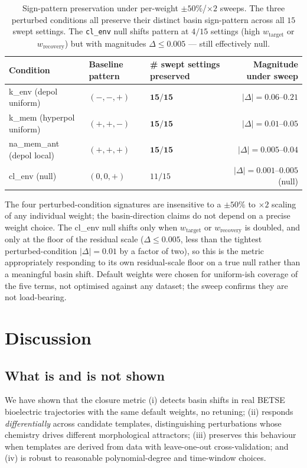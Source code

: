 \documentclass[11pt,a4paper]{article}
\begin{document}
\begin{table}[h]\centering\small
\caption{Sign-pattern preservation under per-weight $\pm 50\%$/$\times 2$ sweeps. The three perturbed conditions all preserve their distinct basin sign-pattern across all $15$ swept settings. The \texttt{cl\_env} null shifts pattern at $4/15$ settings (high $w_{\mathrm{target}}$ or $w_{\mathrm{recovery}}$) but with magnitudes $\Delta\leq 0.005$ --- still effectively null.}\label{tab:weights}
\begin{tabular}{lllr}\toprule
Condition & Baseline pattern & \# swept settings preserved & Magnitude under sweep \\
\midrule
k\_env (depol uniform)        & $(-,-,+)$ & $\mathbf{15/15}$ & $|\Delta|=0.06$--$0.21$ \\
k\_mem (hyperpol uniform)     & $(+,+,-)$ & $\mathbf{15/15}$ & $|\Delta|=0.01$--$0.05$ \\
na\_mem\_ant (depol local)    & $(+,+,+)$ & $\mathbf{15/15}$ & $|\Delta|=0.005$--$0.04$ \\
cl\_env (null)                & $(0,0,+)$ & $11/15$    & $|\Delta|=0.001$--$0.005$ (null) \\
\bottomrule\end{tabular}
\end{table}

The four perturbed-condition signatures are insensitive to a $\pm 50\%$ to $\times 2$ scaling of any individual weight; the basin-direction claims do not depend on a precise weight choice. The cl\_env null shifts only when $w_{\mathrm{target}}$ or $w_{\mathrm{recovery}}$ is doubled, and only at the floor of the residual scale ($\Delta\leq 0.005$, less than the tightest perturbed-condition $|\Delta|=0.01$ by a factor of two), so this is the metric appropriately responding to its own residual-scale floor on a true null rather than a meaningful basin shift. Default weights were chosen for uniform-ish coverage of the five terms, not optimised against any dataset; the sweep confirms they are not load-bearing.

\section{Discussion}

\subsection{What is and is not shown}

We have shown that the closure metric (i) detects basin shifts in real BETSE bioelectric trajectories with the same default weights, no retuning; (ii) responds \emph{differentially} across candidate templates, distinguishing perturbations whose chemistry drives different morphological attractors; (iii) preserves this behaviour when templates are derived from data with leave-one-out cross-validation; and (iv) is robust to reasonable polynomial-degree and time-window choices.
\end{document}

